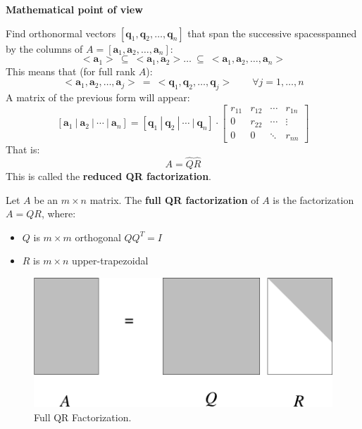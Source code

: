 \begin{flushleft}
    \textcolor{Green3}{ \textbf{Mathematical point of view}}
\end{flushleft}
Find orthonormal vectors $\left[\mathbf{q}_{1}, \mathbf{q}_{2}, \dots, \mathbf{q}_{n}\right]$ that span the successive spaces\break spanned by the columns of $A = \left[\mathbf{a}_{1}, \mathbf{a}_{2}, \dots, \mathbf{a}_{n}\right]$:
\begin{equation*}
    <\mathbf{a}_{1}> \: \subseteq \: <\mathbf{a}_{1}, \mathbf{a}_{2}> \dots \: \subseteq \: <\mathbf{a}_{1}, \mathbf{a}_{2}, \dots, \mathbf{a}_{n}>
\end{equation*}
This means that (for full rank $A$):
\begin{equation*}
    <\mathbf{a}_{1}, \mathbf{a}_{2}, \dots, \mathbf{a}_{j}> \: = \: <\mathbf{q}_{1}, \mathbf{q}_{2}, \dots, \mathbf{q}_{j}> \hspace{2em} \forall j = 1, \dots, n
\end{equation*}
A matrix of the previous form will appear:
\begin{equation*}
    \left[\mathbf{a}_{1} \: | \: \mathbf{a}_{2} \: | \: \cdots \: | \: \mathbf{a}_{n}\right]
    =
    \left[\mathbf{q}_{1} \: | \: \mathbf{q}_{2} \: | \: \cdots \: | \: \mathbf{q}_{n}\right]
    \cdot
    \begin{bmatrix}
        r_{11} & r_{12} & \cdots & r_{1n} \\
        0 & r_{22} & \cdots & \vdots \\
        0 & 0 & \ddots & r_{nn}
    \end{bmatrix}
\end{equation*}
That is:
\begin{equation*}
    A = \widehat{Q}\widehat{R}
\end{equation*}
This is called the \textbf{reduced QR factorization}.

\highspace
Let $A$ be an $m \times n$ matrix. The \textbf{full QR factorization} of $A$ is the factorization $A = QR$, where:
\begin{itemize}
    \item $Q$ is $m \times m$ orthogonal $Q Q^{T} = I$
    \item $R$ is $m \times n$ upper-trapezoidal
\end{itemize}
\begin{figure}[!htp]
    \centering
    \includegraphics[width=.5\textwidth]{img/full-qr-factorization-1.pdf}
    \caption{Full QR Factorization.}
\end{figure}

